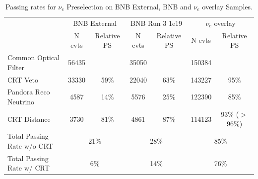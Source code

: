 \begin{table}[h]
\begin{tabular}{ c || c | c || c | c || c | c || }
\cline{2-7}
                                            & \multicolumn{2}{c||}{BNB External} & \multicolumn{2}{c||}{BNB Run 3 1e19} & \multicolumn{2}{c||}{$\nu_e$ overlay} \\ \cline{2-7} 
                                            & N evts        & Relative PS       & N evts         & Relative PS        & N evts       & Relative PS       \\ \hline
\multicolumn{1}{|l||}{Common Optical Filter}  & 56435         &                   & 35050          &                    & 150384       &                   \\ \hline
\multicolumn{1}{|l||}{CRT Veto}                       & 33330         & 59\%          & 22040          & 63\%               & 143227       & 95\%              \\ \hline
\multicolumn{1}{|l||}{Pandora Reco Neutrino} & 4587          & 14\%           & 5576           & 25\%              & 122390       & 85\%              \\ \hline
\multicolumn{1}{|l||}{CRT Distance}                & 3730          & 81\%            & 4861           & 87\%              & 114123       & 93\% ($>$96\%)              \\ \hline \hline 
\multicolumn{1}{|l||}{Total Passing Rate w/o CRT}    &         \multicolumn{2}{c||}{ 21\%}    &   \multicolumn{2}{c||}{28\%}  & \multicolumn{2}{c||}{85\%}\\ \hline
\multicolumn{1}{|l||}{Total Passing Rate w/ CRT}       &                 \multicolumn{2}{c||}{6\%}      & \multicolumn{2}{c||}{14\%}     &  \multicolumn{2}{c||}{76\% }   \\ \hline
\end{tabular}
\caption{Passing rates for $\nu_e$ Preselection on BNB External, BNB and $\nu_e$ overlay Samples.}
\label{tab:PS}
\end{table}


